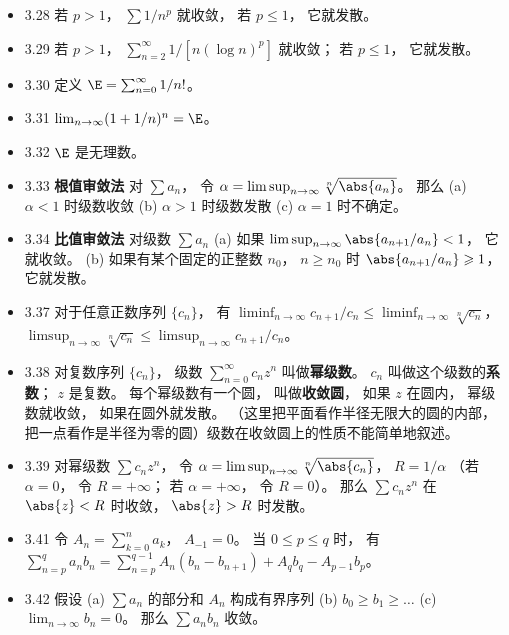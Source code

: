 \begin{itemize}
\item 3.28 若 $p>1$， $\sum 1/n^p$ 就收敛， 若 $p\leqslant 1$， 它就发散。

\item 3.29 若 $p>1$， $\sum_{n=2}^\infty 1/[n(\log n)^p]$ 就收敛； 若 $p\leqslant 1$， 它就发散。

\item 3.30 定义 $\E=\sum_{n=0}^\infty 1/n!$。

\item 3.31 $\lim_{n\to\infty} (1+1/n)^n = \E$。

\item 3.32 $\E$ 是无理数。

\item 3.33 \textbf{根值审敛法} 对 $\sum a_n$， 令 $\alpha = \limsup_{n\to\infty} \sqrt[n]{\abs{a_n}}$。 那么 (a) $\alpha<1$ 时级数收敛 (b) $\alpha>1$ 时级数发散 (c) $\alpha=1$ 时不确定。

\item 3.34 \textbf{比值审敛法} 对级数 $\sum a_n$ (a) 如果 $\limsup_{n\to\infty} \abs{a_{n+1}/a_n}<1$， 它就收敛。 (b) 如果有某个固定的正整数 $n_0$， $n\geqslant n_0$ 时 $\abs{a_{n+1}/a_n}\geqslant 1$， 它就发散。

\item 3.37 对于任意正数序列 $\{c_n\}$， 有 $\liminf_{n\to\infty} c_{n+1}/c_n \leqslant \liminf_{n\to\infty} \sqrt[n]{c_n}$， $\limsup_{n\to\infty} \sqrt[n]{c_n}\leqslant \limsup_{n\to\infty} c_{n+1}/c_n$。

\item 3.38 对复数序列 $\{c_n\}$， 级数 $\sum_{n=0}^\infty c_n z^n$ 叫做\textbf{幂级数}。 $c_n$ 叫做这个级数的\textbf{系数}； $z$ 是复数。 每个幂级数有一个圆， 叫做\textbf{收敛圆}， 如果 $z$ 在圆内， 幂级数就收敛， 如果在圆外就发散。 （这里把平面看作半径无限大的圆的内部，把一点看作是半径为零的圆）级数在收敛圆上的性质不能简单地叙述。

\item 3.39 对幂级数 $\sum c_n z^n$， 令 $\alpha=\limsup_{n\to\infty} \sqrt[n]{\abs{c_n}}$， $R=1/\alpha$ （若 $\alpha=0$， 令 $R=+\infty$； 若 $\alpha=+\infty$， 令 $R=0$）。 那么 $\sum c_n z^n$ 在 $\abs{z}<R$ 时收敛， $\abs{z}>R$ 时发散。

\item 3.41 令 $A_n=\sum_{k=0}^n a_k$， $A_{-1}=0$。 当 $0\leqslant p\leqslant q$ 时， 有 $\sum_{n=p}^q a_n b_n = \sum_{n=p}^{q-1} A_n(b_n-b_{n+1}) + A_qb_q - A_{p-1} b_p$。

\item 3.42 假设 (a) $\sum a_n$ 的部分和 $A_n$ 构成有界序列 (b) $b_0\geqslant b_1\geqslant \dots$ (c) $\lim_{n\to\infty} b_n=0$。 那么 $\sum a_n b_n$ 收敛。


\end{itemize}
